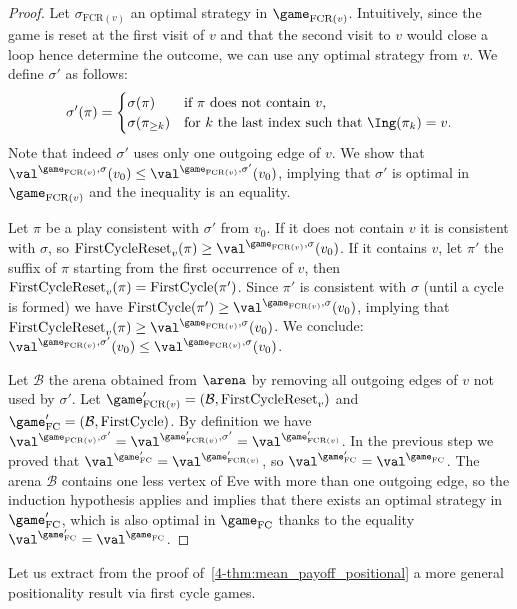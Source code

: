 \begin{proof}
Let $\sigma_{\text{FCR}(v)}$ an optimal strategy in $\game_{\text{FCR}(v)}$.
Intuitively, since the game is reset at the first visit of $v$ and that the second visit to $v$ would close a loop hence determine the outcome, 
we can use any optimal strategy from $v$.
We define $\sigma'$ as follows:
\[
\sigma'(\pi) = 
\begin{cases}	
\sigma(\pi) & \text{if } \pi \text{ does not contain } v, \\
\sigma(\pi_{\ge k}) & \text{for } k \text{ the last index such that } \Ing(\pi_k) = v.
\end{cases}
\]
Note that indeed $\sigma'$ uses only one outgoing edge of $v$.
We show that $\val^{\game_{\text{FCR}(v)},\sigma}(v_0) \le \val^{\game_{\text{FCR}(v)},\sigma'}(v_0)$,
implying that $\sigma'$ is optimal in $\game_{\text{FCR}(v)}$ and the inequality is an equality.

Let $\pi$ be a play consistent with $\sigma'$ from $v_0$.
If it does not contain $v$ it is consistent with $\sigma$, so $\FirstCycleReset_v(\pi) \ge \val^{\game_{\text{FCR}(v)},\sigma}(v_0)$.
If it contains $v$, let $\pi'$ the suffix of $\pi$ starting from the first occurrence of $v$,
then $\mathrm{FirstCycleReset}_v(\pi) = \mathrm{FirstCycle}(\pi')$.
Since $\pi'$ is consistent with $\sigma$ (until a cycle is formed) we have $\FirstCycle(\pi') \ge \val^{\game_{\text{FCR}(v)},\sigma}(v_0)$,
implying that $\FirstCycleReset_v(\pi) \ge \val^{\game_{\text{FCR}(v)},\sigma}(v_0)$.
We conclude: $\val^{\game_{\text{FCR}(v)},\sigma'}(v_0) \le \val^{\game_{\text{FCR}(v)},\sigma}(v_0)$.

Let $\mathcal{B}$ the arena obtained from $\arena$ by removing all outgoing edges of $v$ not used by $\sigma'$.
Let $\game'_{\text{FCR}(v)} = (\mathcal{B}, \FirstCycleReset_v)$ and $\game'_{\text{FC}} = (\mathcal{B}, \FirstCycle)$.
By definition we have $\val^{\game_{\text{FCR}(v)},\sigma'} = \val^{\game'_{\text{FCR}(v)},\sigma'} = \val^{\game'_{\text{FCR}(v)}}$.
In the previous step we proved that $\val^{\game'_{\text{FC}}} = \val^{\game'_{\text{FCR}(v)}}$,
so $\val^{\game'_{\text{FC}}} = \val^{\game_{\text{FC}}}$.
The arena $\mathcal{B}$ contains one less vertex of Eve with more than one outgoing edge,
so the induction hypothesis applies and implies that there exists an optimal strategy in $\game'_{\text{FC}}$,
which is also optimal in $\game_{\text{FC}}$ thanks to the equality $\val^{\game'_{\text{FC}}} = \val^{\game_{\text{FC}}}$.
\end{proof}

Let us extract from the proof of~\cref{4-thm:mean_payoff_positional} a more general positionality result via first cycle games.

